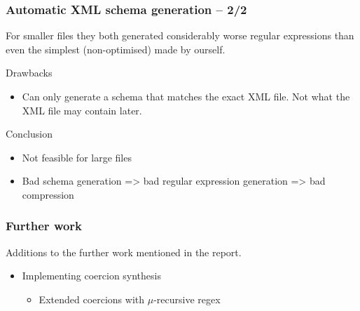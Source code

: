 \documentclass[slidestop,compress,mathserif, xcolor=table]{beamer}
\begin{document}
\begin{frame}[c]
  \frametitle{Automatic XML schema generation -- 2/2}
  
  For smaller files they both generated considerably worse regular expressions
  than even the simplest (non-optimised) made by ourself.

  Drawbacks

  \begin{itemize}
  \item Can only generate a schema that matches the exact XML file. Not what the
    XML file may contain later. 
  \end{itemize}

  Conclusion 

  \begin{itemize}
  \item Not feasible for large files

  \item Bad schema generation => bad regular expression generation => bad compression
  \end{itemize}

\end{frame}

\begin{frame}[c]
  \frametitle{Further work}
  
  Additions to the further work mentioned in the report.

  \begin{itemize}
  \item Implementing coercion synthesis
    \begin{itemize}
    \item Extended coercions with $\mu$-recursive regex
    \end{itemize}


  \end{itemize}

\end{frame}
\end{document}
